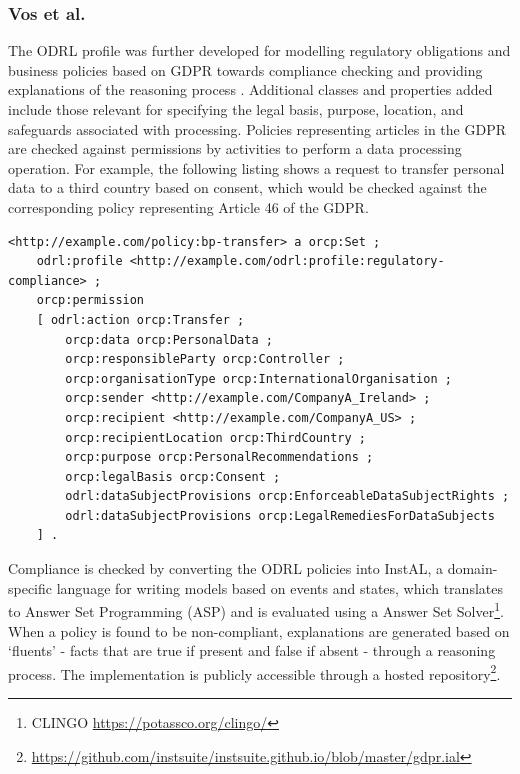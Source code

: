 \subsubsection{Vos et al.}
The ODRL profile was further developed for modelling regulatory obligations and business policies based on GDPR towards compliance checking and providing explanations of the reasoning process \cite{vos_odrl_2019}. Additional classes and properties added include those relevant for specifying the legal basis, purpose, location, and safeguards associated with processing. Policies representing articles in the GDPR are checked against permissions by activities to perform a data processing operation. For example, the following listing shows a request to transfer personal data to a third country based on consent, which would be checked against the corresponding policy representing Article 46 of the GDPR. 
\begin{lstlisting}
<http://example.com/policy:bp-transfer> a orcp:Set ;
    odrl:profile <http://example.com/odrl:profile:regulatory-compliance> ;
    orcp:permission
    [ odrl:action orcp:Transfer ;
        orcp:data orcp:PersonalData ;
        orcp:responsibleParty orcp:Controller ;
        orcp:organisationType orcp:InternationalOrganisation ;
        orcp:sender <http://example.com/CompanyA_Ireland> ;
        orcp:recipient <http://example.com/CompanyA_US> ;
        orcp:recipientLocation orcp:ThirdCountry ;
        orcp:purpose orcp:PersonalRecommendations ;
        orcp:legalBasis orcp:Consent ;
        odrl:dataSubjectProvisions orcp:EnforceableDataSubjectRights ;
        odrl:dataSubjectProvisions orcp:LegalRemediesForDataSubjects
    ] .
\end{lstlisting}
Compliance is checked by converting the ODRL policies into InstAL, a domain-specific language for writing models based on events and states, which translates to Answer Set Programming (ASP) and is evaluated using a Answer Set Solver\footnote{CLINGO \url{https://potassco.org/clingo/}}. When a policy is found to be non-compliant, explanations are generated based on `fluents' - facts that are true if present and false if absent - through a reasoning process. The implementation is publicly accessible through a hosted repository\footnote{\url{https://github.com/instsuite/instsuite.github.io/blob/master/gdpr.ial}}. 

